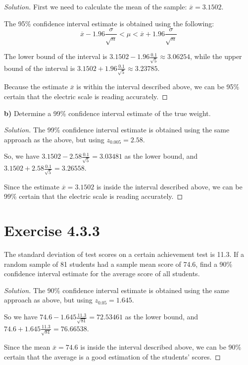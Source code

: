 \documentclass[titlepage, letterpaper]{article} %
\newcommand{\spacepls}{\vspace{5mm}}
\renewcommand\qedsymbol{\(\blacksquare\)}
\newenvironment{solution}
{\renewcommand\qedsymbol{$\square$}\begin{proof}[Solution]}
{\end{proof}}
\begin{document}
\begin{solution}
First we need to calculate the mean of the sample: $\overline{x} = 3.1502$.

The 95\% confidence interval estimate is obtained using the following:
\[\overline{x} - 1.96 \frac{\sigma}{\sqrt{n}} < \mu < \overline{x} + 1.96 \frac{\sigma}{\sqrt{n}}\]

The lower bound of the interval is $3.1502 - 1.96\frac{0.1}{\sqrt{5}} \approx 3.06254$,
while the upper bound of the interval is $3.1502 + 1.96\frac{0.1}{\sqrt{5}} \approx 3.23785$.

Because the estimate $\overline{x}$ is within the interval described above,
we can be 95\% certain that the electric scale is reading accurately.
\end{solution}

\spacepls

{\large \textbf{b)} Determine a 99\% confidence interval estimate of the true weight.}

\begin{solution}
The 99\% confidence interval estimate is obtained using the same approach as the above, but using $z_{0.005} = 2.58$.

So, we have $3.1502 - 2.58\frac{0.1}{\sqrt{5}} = 3.03481$ as the lower bound,
and $3.1502 + 2.58\frac{0.1}{\sqrt{5}} = 3.26558$.

Since the estimate $\overline{x} = 3.1502$ is inside the interval described above,
we can be 99\% certain that the electric scale is reading accurately.
\end{solution}

\spacepls

\section{Exercise 4.3.3}

{\large The standard deviation of test scores on a certain achievement test is 11.3.
If a random sample of 81 students had a sample mean score of 74.6,
find a 90\% confidence interval estimate for the average score of all students.}

\begin{solution}
The 90\% confidence interval estimate is obtained using the same approach as above, but using $z_{0.05} = 1.645$.

So we have $74.6 - 1.645\frac{11.3}{\sqrt{81}} = 72.53461$ as the lower bound,
and $74.6 + 1.645\frac{11.3}{\sqrt{81}} = 76.66538$.

Since the mean $\overline{x} = 74.6$ is inside the interval described above,
we can be 90\% certain that the average is a good estimation of the students' scores.
\end{solution}
\end{document}
